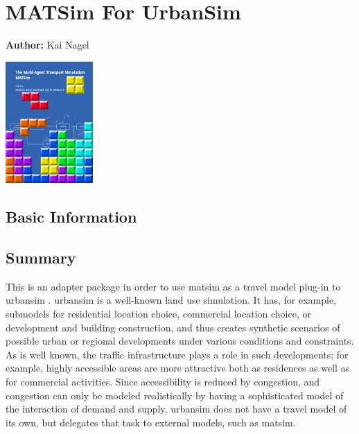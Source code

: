 \chapter{MATSim For UrbanSim}
\label{ch:matsim4urbansim}

\hfill \textbf{Author:} Kai Nagel

\begin{center} \includegraphics[width=0.25\textwidth, angle=0]{frontmatter/figures/MATSimBook} \end{center}

\section{Basic Information}
\label{sec:matsim4urbansim-stdInfo}


\section{Summary}


This is an adapter package in order to use \gls{matsim} as a travel model plug-in to \acrshort{urbansim} \citep[e.g.][see \url{http://www.urbansim.org}]{WaddellEtc2003UrbanSim}.
%
\acrshort{urbansim} is a well-known land use simulation.  It has, for example, submodels for residential location choice, commercial location choice, or development and building construction, and thus creates synthetic scenarios of possible urban or regional developments under various conditions and constraints.  As is well known, the traffic infrastructure plays a role in such developments; for example, highly accessible areas are more attractive both as residences as well as for commercial activities.  Since accessibility is reduced by congestion, and congestion can only be modeled realistically by having a sophisticated model of the interaction of demand and supply, \acrshort{urbansim} does not have a travel model of its own, but delegates that task to external models, such as \gls{matsim}.

